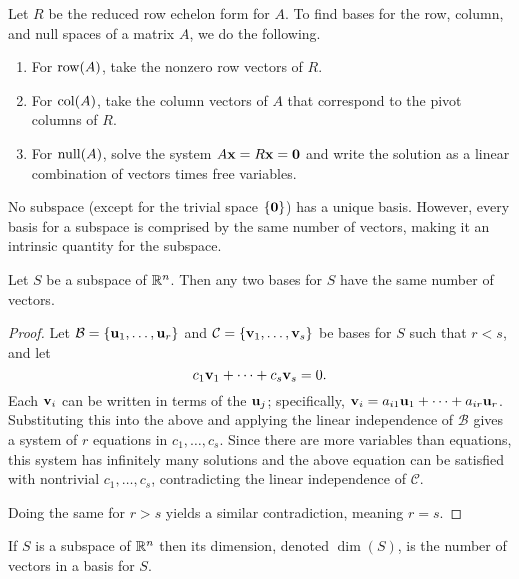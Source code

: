 \documentclass[../m073main.tex]{subfiles}
\begin{document}
\begin{theorem}
	Let $R$ be the reduced row echelon form for $A$.
	To find bases for the row, column, and null spaces of a matrix $A$, we do the following.
	\begin{enumerate}[label=(\alph*)]
		\item For $\operatorname{row}(A)$, take the nonzero row vectors of $R$.
		\item For $\operatorname{col}(A)$, take the column vectors of $A$ that correspond to the pivot columns of $R$.
		\item For $\operatorname{null}(A)$, solve the system $A \mathbf{x} = R \mathbf{x} = \mathbf{0}$ and write the solution as a linear combination of vectors times free variables.
	\end{enumerate}
\end{theorem}

No subspace (except for the trivial space $\left\{ \mathbf{0} \right\}$) has a unique basis.
However, every basis for a subspace is comprised by the same number of vectors, making it an intrinsic quantity for the subspace.

\pagebreak

\begin{theorem}
	Let $S$ be a subspace of $\mathbb{R}^n$.
	Then any two bases for $S$ have the same number of vectors.
\end{theorem}

\begin{proof}
	Let $\mathcal{B} = \left\{ \mathbf{u}_1, \ldots, \mathbf{u}_r \right\}$ and $\mathcal{C} = \left\{ \mathbf{v}_1, \ldots, \mathbf{v}_s \right\}$ be bases for $S$ such that $r < s$, and let
	\[ c_1 \mathbf{v}_1 + \cdots + c_s \mathbf{v}_s = 0. \]
	Each $\mathbf{v}_i$ can be written in terms of the $\mathbf{u}_j$; specifically, $\mathbf{v}_i = a_{i 1} \mathbf{u}_1 + \cdots + a_{i r} \mathbf{u}_r$.
	Substituting this into the above and applying the linear independence of $\mathcal{B}$ gives a system of $r$ equations in $c_1, \ldots, c_s$.
	Since there are more variables than equations, this system has infinitely many solutions and the above equation can be satisfied with nontrivial $c_1, \ldots, c_s$, contradicting the linear independence of $\mathcal{C}$.

	Doing the same for $r > s$ yields a similar contradiction, meaning $r = s$.
\end{proof}

\begin{definition}[Dimension]
	If $S$ is a subspace of $\mathbb{R}^n$ then its dimension, denoted $\dim (S)$, is the number of vectors in a basis for $S$.
\end{definition}
\end{document}
